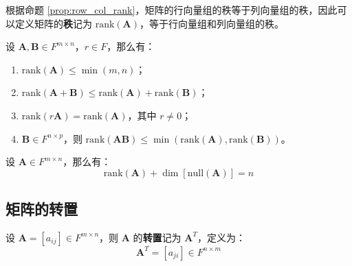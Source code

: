 \begin{definition}
    根据命题 \ref{prop:row_col_rank}，矩阵的行向量组的秩等于列向量组的秩，因此可以定义矩阵的\textbf{秩}记为 $\mathrm{rank}(\mathbf{A})$，等于行向量组和列向量组的秩。
\end{definition}

\begin{proposition}[矩阵秩的性质]
    设 $\mathbf{A},\mathbf{B} \in F^{m \times n}$，$r\in F$，那么有：
    \begin{enumerate}
        \item $\mathrm{rank}(\mathbf{A}) \leq \min(m,n)$；
        \item $\mathrm{rank}(\mathbf{A} + \mathbf{B}) \leq \mathrm{rank}(\mathbf{A}) + \mathrm{rank}(\mathbf{B})$；
        \item $\mathrm{rank}(r\mathbf{A}) = \mathrm{rank}(\mathbf{A})$，其中 $r\neq 0$；
        \item $\mathbf{B} \in F^{n \times p}$，则 $\mathrm{rank}(\mathbf{A}\mathbf{B}) \leq \min(\mathrm{rank}(\mathbf{A}),\mathrm{rank}(\mathbf{B}))$。
    \end{enumerate}
\end{proposition}

\begin{theorem}
    设 $\mathbf{A}\in F^{m \times n}$，那么有：
    \[
        \mathrm{rank}(\mathbf{A}) + \dim[\mathrm{null}(\mathbf{A})] = n
    \]
    \label{thm:rank_nullity_theorem}
\end{theorem}

\vspace{1em}
\subsection{矩阵的转置}
\begin{definition}
    设 $\mathbf{A} = [a_{ij}] \in F^{m \times n}$，则 $\mathbf{A}$ 的\textbf{转置}记为 $\mathbf{A}^T$，定义为：
    \[
        \mathbf{A}^T = [a_{ji}] \in F^{n \times m}
    \]
    \label{def:matrix_transpose}
\end{definition}


